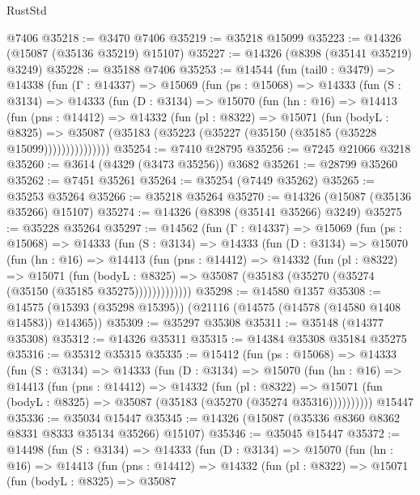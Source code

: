 \begin{lexlean}{RustStd}
\begin{coremodule}
    @7406
@35218 := @3470 @7406
@35219 := @35218 @15099
@35223 := @14326 (@15087 (@35136 @35219) @15107)
@35227 := @14326 (@8398 (@35141 @35219) @3249)
@35228 := @35188 @7406
@35253 := @14544
    (fun (tail0 : @3479) =>
    @14338
      (fun (Γ : @14337) =>
      @15069
        (fun (ps : @15068) =>
        @14333
          (fun (S : @3134) =>
          @14333
            (fun (D : @3134) =>
            @15070
              (fun (hn : @16) =>
              @14413
                (fun (pns : @14412) =>
                @14332
                  (fun (pl : @8322) =>
                  @15071
                    (fun (bodyL : @8325) =>
                    @35087 (@35183 (@35223 (@35227 (@35150 (@35185 (@35228 @15099)))))))))))))))
@35254 := @7410 @28795
@35256 := @7245 @21066 @3218
@35260 := @3614 (@4329 (@3473 @35256)) @3682
@35261 := @28799 @35260
@35262 := @7451 @35261
@35264 := @35254 (@7449 @35262)
@35265 := @35253 @35264
@35266 := @35218 @35264
@35270 := @14326 (@15087 (@35136 @35266) @15107)
@35274 := @14326 (@8398 (@35141 @35266) @3249)
@35275 := @35228 @35264
@35297 := @14562
    (fun (Γ : @14337) =>
    @15069
      (fun (ps : @15068) =>
      @14333
        (fun (S : @3134) =>
        @14333
          (fun (D : @3134) =>
          @15070
            (fun (hn : @16) =>
            @14413
              (fun (pns : @14412) =>
              @14332
                (fun (pl : @8322) =>
                @15071
                  (fun (bodyL : @8325) =>
                  @35087 (@35183 (@35270 (@35274 (@35150 (@35185 @35275)))))))))))))
@35298 := @14580 @1357
@35308 := @14575 (@15393 (@35298 @15395)) (@21116 (@14575 (@14578 (@14580 @1408 @14583)) @14365))
@35309 := @35297 @35308
@35311 := @35148 (@14377 @35308)
@35312 := @14326 @35311
@35315 := @14384 @35308 @35184 @35275
@35316 := @35312 @35315
@35335 := @15412
    (fun (ps : @15068) =>
    @14333
      (fun (S : @3134) =>
      @14333
        (fun (D : @3134) =>
        @15070
          (fun (hn : @16) =>
          @14413
            (fun (pns : @14412) =>
            @14332
              (fun (pl : @8322) =>
              @15071 (fun (bodyL : @8325) => @35087 (@35183 (@35270 (@35274 @35316))))))))))
    @15447
@35336 := @35034 @15447
@35345 := @14326 (@15087 (@35336 @8360 @8362 @8331 @8333 @35134 @35266) @15107)
@35346 := @35045 @15447
@35372 := @14498
    (fun (S : @3134) =>
    @14333
      (fun (D : @3134) =>
      @15070
        (fun (hn : @16) =>
        @14413
          (fun (pns : @14412) =>
          @14332
            (fun (pl : @8322) =>
            @15071
              (fun (bodyL : @8325) =>
              @35087

\end{coremodule}
\end{lexlean}
